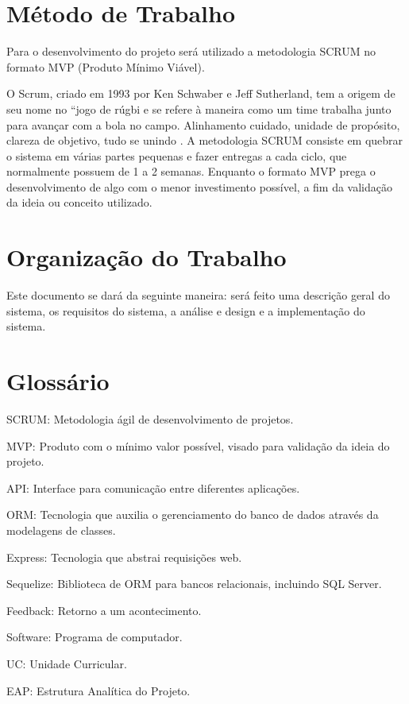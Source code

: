 \section{Método de Trabalho}
Para o desenvolvimento do projeto será utilizado a metodologia SCRUM no formato MVP (Produto Mínimo Viável).

O Scrum, criado em 1993 por Ken Schwaber e Jeff Sutherland, tem a origem de seu nome no “jogo de rúgbi e se refere à maneira como um time trabalha junto para avançar com a bola no campo. Alinhamento cuidado, unidade de propósito, clareza de objetivo, tudo se unindo \cite{rocha2015metodologia}.
A metodologia SCRUM consiste em quebrar o sistema em várias partes pequenas e fazer entregas a cada ciclo, que normalmente possuem de 1 a 2 semanas.
Enquanto o formato MVP prega o desenvolvimento de algo com o menor investimento possível, a fim da validação da ideia ou conceito utilizado.

\section{Organização do Trabalho}
Este documento se dará da seguinte maneira: será feito uma descrição geral do sistema, os requisitos do sistema, a análise e design e a implementação do sistema.

\section{Glossário}
SCRUM:		Metodologia ágil de desenvolvimento de projetos.

MVP:		Produto com o mínimo valor possível, visado para validação da ideia do projeto.

API:		Interface para comunicação entre diferentes aplicações.

ORM:		Tecnologia que auxilia o gerenciamento do banco de dados através da modelagens de classes.

Express:	Tecnologia que abstrai requisições web.

Sequelize:	Biblioteca de ORM para bancos relacionais, incluindo SQL Server.

Feedback:	Retorno a um acontecimento.

Software:	Programa de computador.

UC:			Unidade Curricular.

EAP:		Estrutura Analítica do Projeto.

